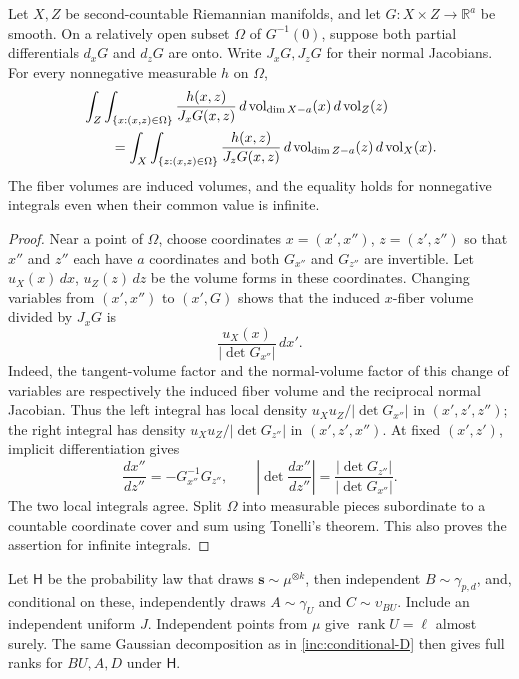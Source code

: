 \begin{lemma}\label{inc:swap}
Let \(X,Z\) be second-countable Riemannian manifolds, and let
\(G:X\times Z\to\mathbb R^a\) be smooth.  On a relatively open subset
\(\Omega\) of \(G^{-1}(0)\), suppose both partial differentials
\(d_xG\) and \(d_zG\) are onto.  Write \(J_xG,J_zG\) for their normal
Jacobians.  For every nonnegative measurable \(h\) on \(\Omega\),
\begin{align}
 &\int_Z\int_{\{x:(x,z)\in\Omega\}}
       \frac{h(x,z)}{J_xG(x,z)}
       \,d\operatorname{vol}_{\dim X-a}(x)\,d\operatorname{vol}_Z(z)
       \notag\\
 &\qquad=
 \int_X\int_{\{z:(x,z)\in\Omega\}}
       \frac{h(x,z)}{J_zG(x,z)}
       \,d\operatorname{vol}_{\dim Z-a}(z)\,d\operatorname{vol}_X(x).
 \label{inc:swap-identity}
\end{align}
The fiber volumes are induced volumes, and the equality holds for
nonnegative integrals even when their common value is infinite.
\end{lemma}

\begin{proof}
Near a point of \(\Omega\), choose coordinates
\(x=(x',x'')\), \(z=(z',z'')\) so that \(x''\) and \(z''\) each have
\(a\) coordinates and both \(G_{x''}\) and \(G_{z''}\) are invertible.
Let \(u_X(x)\,dx\), \(u_Z(z)\,dz\) be the volume forms in these
coordinates.  Changing variables from \((x',x'')\) to \((x',G)\)
shows that the induced \(x\)-fiber volume divided by \(J_xG\) is
\[
 \frac{u_X(x)}{|\det G_{x''}|}\,dx'.
\]
Indeed, the tangent-volume factor and the normal-volume factor of this
change of variables are respectively the induced fiber volume and the
reciprocal normal Jacobian.  Thus the left integral has local density
\(u_Xu_Z/|\det G_{x''}|\) in \((x',z',z'')\); the right integral has
density \(u_Xu_Z/|\det G_{z''}|\) in \((x',z',x'')\).
At fixed \((x',z')\), implicit differentiation gives
\[
 \frac{dx''}{dz''}=-G_{x''}^{-1}G_{z''},\qquad
 \left|\det\frac{dx''}{dz''}\right|
 =\frac{|\det G_{z''}|}{|\det G_{x''}|}.
\]
The two local integrals agree.  Split \(\Omega\) into measurable pieces
subordinate to a countable coordinate cover and sum using Tonelli's
theorem.  This also proves the assertion for infinite integrals.
\end{proof}

Let \(\mathsf H\) be the probability law that draws
\(\mathbf s\sim\mu^{\otimes k}\), then independent
\(B\sim\gamma_{p,d}\), and, conditional on these, independently draws
\(A\sim\gamma_U\) and \(C\sim\upsilon_{BU}\).  Include an independent
uniform \(J\).  Independent points from \(\mu\) give
\(\operatorname{rank}U=\ell\) almost surely.  The same Gaussian
decomposition as in \eqref{inc:conditional-D} then gives full ranks for
\(BU,A,D\) under \(\mathsf H\).

